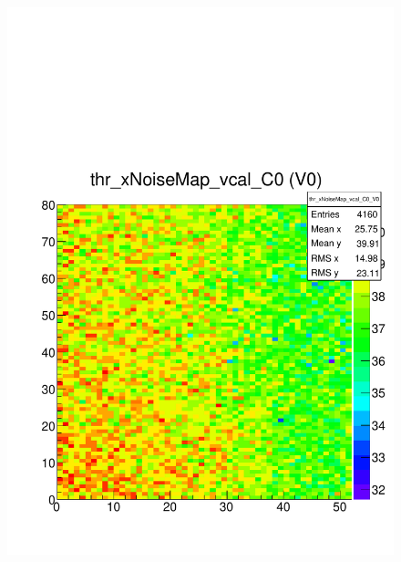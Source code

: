 \documentclass[a4paper,12pt,twoside]{article}
\begin{document}
\begin{figure} [h!]
\centering
\begin{minipage}{.48\textwidth}
  \centering
  \includegraphics[width=\textwidth]{./HRSCurves_thrMap.pdf}
  \label{HRSCurves-thrMap}
\end{minipage}%
\hspace{2mm}
\begin{minipage}{.48\textwidth}
  \centering

\end{minipage}
\end{figure}
\end{document}
